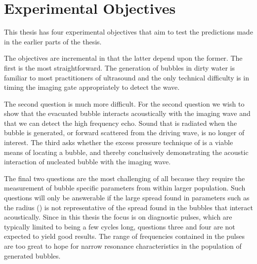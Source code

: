 \section{Experimental Objectives} \label{sec:WE:objectives}

This thesis has four experimental objectives that aim to test the predictions made in the earlier parts of the thesis.

The objectives are incremental in that the latter depend upon the former.
The first is the most straightforward.
The generation of bubbles in dirty water is familiar to most practitioners of ultrasound
and the only technical difficulty is in timing the imaging gate appropriately to detect the wave.

The second question is much more difficult.
For the second question we wish to show that the evacuated bubble interacts acoustically with the imaging wave
and that we can detect the high frequency echo.
Sound that is radiated when the bubble is generated,
or forward scattered from the driving wave, is no longer of interest.
The third asks whether the excess pressure technique of  is a viable means of locating a bubble, 
and thereby conclusively demonstrating the acoustic interaction of nucleated bubble with the imaging wave.

The final two questions are the most challenging of all because they require
the measurement of bubble specific parameters from within larger population.
Such questions will only be answerable if the large  spread found in parameters such
as the radius () is not representative of the spread found in the bubbles that interact acoustically.
Since in this thesis the focus is on diagnostic pulses, 
which are typically limited to being a few cycles long,
questions three and four are not expected to yield good results.
The range of frequencies contained in the pulses are too great to hope for narrow resonance characteristics in the population of generated bubbles.


